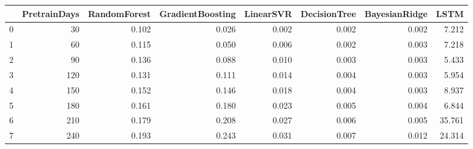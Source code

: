 \begin{tabular}{lrrrrrrr}
\toprule
{} &  PretrainDays &  RandomForest &  GradientBoosting &  LinearSVR &  DecisionTree &  BayesianRidge &   LSTM \\
\midrule
0 &            30 &         0.102 &             0.026 &      0.002 &         0.002 &          0.002 &  7.212 \\
1 &            60 &         0.115 &             0.050 &      0.006 &         0.002 &          0.003 &  7.218 \\
2 &            90 &         0.136 &             0.088 &      0.010 &         0.003 &          0.003 &  5.433 \\
3 &           120 &         0.131 &             0.111 &      0.014 &         0.004 &          0.003 &  5.954 \\
4 &           150 &         0.152 &             0.146 &      0.018 &         0.004 &          0.003 &  8.937 \\
5 &           180 &         0.161 &             0.180 &      0.023 &         0.005 &          0.004 &  6.844 \\
6 &           210 &         0.179 &             0.208 &      0.027 &         0.006 &          0.005 & 35.761 \\
7 &           240 &         0.193 &             0.243 &      0.031 &         0.007 &          0.012 & 24.314 \\
\bottomrule
\end{tabular}
